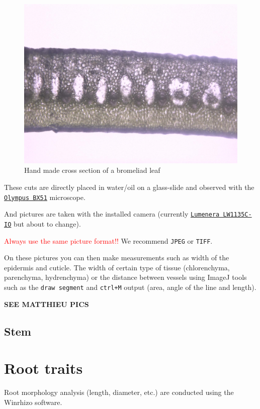 \documentclass[
  12pt,
  american,
  a4paper,
  extrafontsizes,onecolumn,openright
  ]{memoir}
\begin{document}
\begin{figure}

{\centering \includegraphics[width=0.5\linewidth]{document/trait/shootmorpho/bromecut1} 

}

\caption{Hand made cross section of a bromeliad leaf}\label{fig:bromecut}
\end{figure}

\normalsize

These cuts are directly placed in water/oil on a glass-slide and observed with the \href{document/machine/Olympus\%20BX51/olympus_bx-51_bx52_microscope_manual.pdf}{\texttt{Olympus\ BX51}} microscope.

And pictures are taken with the installed camera (currently \href{document/machine/Lumenera\%20LW1135C-IO/Lumenera-USB-GigE-Camera-User-Manual.pdf}{\texttt{Lumenera\ LW1135C-IO}} but about to change).

\textcolor{red}{Always use the same picture format!!}
We recommend \texttt{JPEG} or \texttt{TIFF}.

On these pictures you can then make measurements such as width of the epidermis and cuticle.
The width of certain type of tissue (chlorenchyma, parenchyma, hydrenchyma) or the distance between vessels using ImageJ tools such as the \texttt{draw\ segment} and \texttt{ctrl+M} output (area, angle of the line and length).

\textbf{SEE MATTHIEU PICS}

\hypertarget{stem}{%
\subsection{Stem}\label{stem}}

\hypertarget{root-traits}{%
\section{Root traits}\label{root-traits}}

Root morphology analysis (length, diameter, etc.) are conducted using the Winrhizo software.
\end{document}
